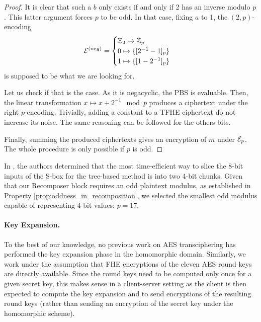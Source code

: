 \begin{proof}
It is clear that such a $b$ only exists if and only if 2 has an inverse modulo $p$. This latter argument forces $p$ to be odd. In that case, fixing $a$ to 1, the $(2, p)$-encoding 
$$
\mathcal{E}^{(neg)} = \begin{cases} \mathbb{Z}_2 \mapsto \mathbb{Z}_{p} \\ 0 \mapsto \{[2^{-1} - 1]_p\} \\ 1 \mapsto \{[1 - 2^{-1}]_p\} \end{cases}
$$ 
is supposed to be what we are looking for.

Let us check if that is the case. As it is negacyclic, the \gls{PBS} is evaluable. Then, the linear transformation $x \mapsto x + 2^{-1} \mod p $ produces a ciphertext under the right $p$-encoding. Trivially, adding a constant to a \gls{TFHE} ciphertext do not increase its noise. The same reasoning can be followed for the others bits.

Finally, summing the produced ciphertexts gives an encryption of $m$ under $\mathcal{E}_p$. The whole procedure is only possible if $p$ is odd.
\end{proof}


In \cite{DBLP:conf/wahc/TramaCBS23}, the authors determined that the most time-efficient way to slice the 8-bit inputs of the \gls{S-box} for the tree-based method is into two 4-bit chunks. Given that our Recomposer block requires an odd plaintext modulus, as established in Property \ref{prop:oddness_in_recomposition}, we selected the smallest odd modulus capable of representing 4-bit values: $p=17$. 

\paragraph{Key Expansion.} 
To the best of our knowledge, no previous work on \gls{AES} transciphering has performed the key expansion phase in the homomorphic domain. Similarly, we work under the assumption that \gls{FHE} encryptions of the eleven \gls{AES} round keys are directly available. Since the round keys need to be computed only once for a given secret key, this makes sense in a client-server setting as the client is then expected to compute the key expansion and to send encryptions of the resulting round keys (rather than sending an encryption of the secret key under the homomorphic scheme).



